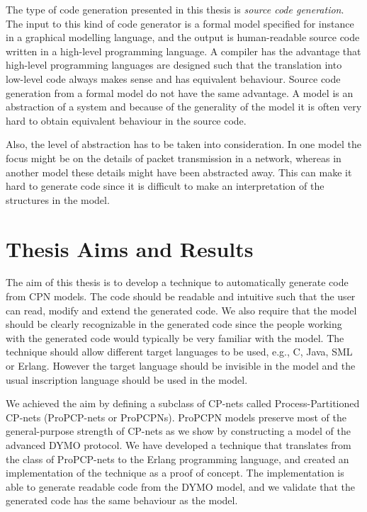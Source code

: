 The type of code generation presented in this thesis is \emph{source code generation}. The input to this kind of code generator is a formal model specified for instance in a graphical modelling language, and the output is human-readable source code written in a high-level programming language. A compiler has the advantage that high-level programming languages are designed such that the translation into low-level code always makes sense and has equivalent behaviour. Source code generation from a formal model do not have the same advantage. A model is an abstraction of a system and because of the generality of the model it is often very hard to obtain equivalent behaviour in the source code.

Also, the level of abstraction has to be taken into consideration. In one model the focus might be on the details of packet transmission in a network, whereas in another model these details might have been abstracted away. This can make it hard to generate code since it is difficult to make an interpretation of the structures in the model.

\section{Thesis Aims and Results}
The aim of this thesis is to develop a technique to automatically generate code from CPN models. The code should be readable and intuitive such that the user can read, modify and extend the generated code. We also require that the model should be clearly recognizable in the generated code since the people working with the generated code would typically be very familiar with the model. The technique should allow different target languages to be used, e.g., C, Java, SML or Erlang. However the target language should be invisible in the model and the usual inscription language should be used in the model.

We achieved the aim by defining a subclass of CP-nets called Process-Partitioned CP-nets (ProPCP-nets or ProPCPNs). ProPCPN models preserve most of the general-purpose strength of CP-nets as we show by constructing a model of the advanced DYMO protocol. We have developed a technique that translates from the class of ProPCP-nets to the Erlang programming language, and created an implementation of the technique as a proof of concept. The implementation is able to generate readable code from the DYMO model, and we validate that the generated code has the same behaviour as the model. 


